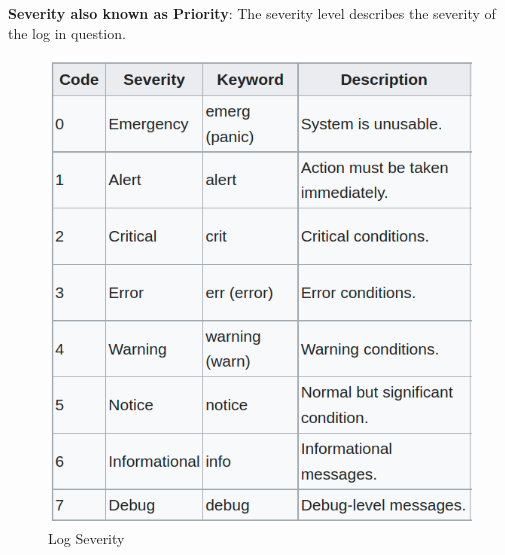 \begin{flushleft}
\textbf{Severity also known as Priority}:
The severity level describes the severity of the log in question.
\begin{figure}[h!]
	\centering
	\includegraphics[scale=0.4]{content/chapter16/images/priority.png}
	\caption{Log Severity}
	\label{fig:severity}
\end{figure}




\end{flushleft}
\newpage



